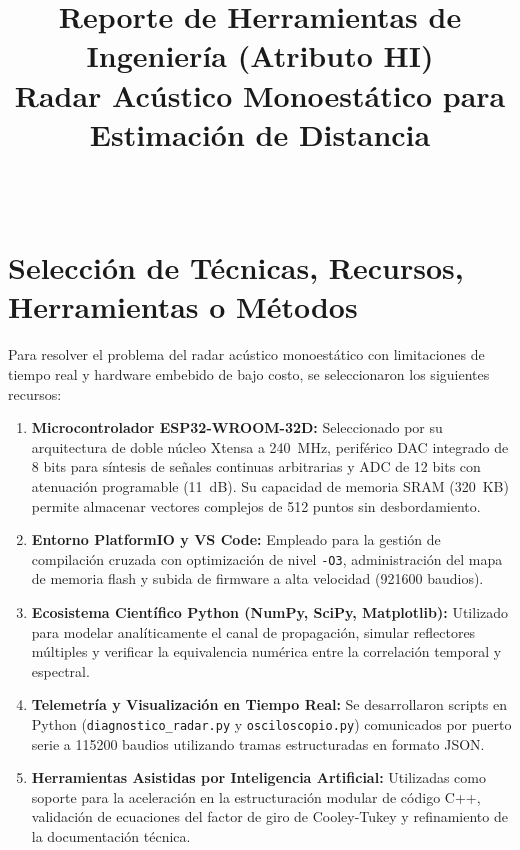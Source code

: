 \documentclass[journal]{IEEEtran}
\begin{document}
\title{Reporte de Herramientas de Ingenier\'ia (Atributo HI)\\Radar Ac\'ustico Monoest\'atico para Estimaci\'on de Distancia}

\author{\\
}


\maketitle

\section{Selecci\'on de T\'ecnicas, Recursos, Herramientas o M\'etodos}
Para resolver el problema del radar ac\'ustico monoest\'atico con limitaciones de tiempo real y hardware embebido de bajo costo, se seleccionaron los siguientes recursos:

\begin{enumerate}
\item \textbf{Microcontrolador ESP32-WROOM-32D:} Seleccionado por su arquitectura de doble n\'ucleo Xtensa a 240~MHz, perif\'erico DAC integrado de 8 bits para s\'intesis de se\~nales continuas arbitrarias y ADC de 12 bits con atenuaci\'on programable (11~dB). Su capacidad de memoria SRAM (320~KB) permite almacenar vectores complejos de 512 puntos sin desbordamiento.
\item \textbf{Entorno PlatformIO y VS Code:} Empleado para la gesti\'on de compilaci\'on cruzada con optimizaci\'on de nivel \texttt{-O3}, administraci\'on del mapa de memoria flash y subida de firmware a alta velocidad (921600 baudios).
\item \textbf{Ecosistema Cient\'ifico Python (NumPy, SciPy, Matplotlib):} Utilizado para modelar anal\'iticamente el canal de propagaci\'on, simular reflectores m\'ultiples y verificar la equivalencia num\'erica entre la correlaci\'on temporal y espectral.
\item \textbf{Telemetr\'ia y Visualizaci\'on en Tiempo Real:} Se desarrollaron scripts en Python (\texttt{diagnostico\_radar.py} y \texttt{osciloscopio.py}) comunicados por puerto serie a 115200 baudios utilizando tramas estructuradas en formato JSON.
\item \textbf{Herramientas Asistidas por Inteligencia Artificial:} Utilizadas como soporte para la aceleraci\'on en la estructuraci\'on modular de c\'odigo C++, validaci\'on de ecuaciones del factor de giro de Cooley-Tukey y refinamiento de la documentaci\'on t\'ecnica.
\end{enumerate}
\end{document}
